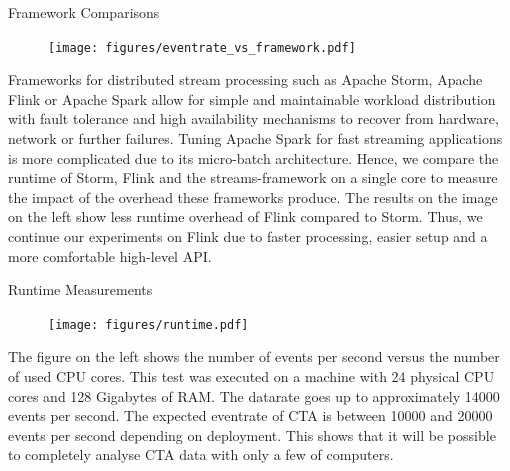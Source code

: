 \begin{multicols}{2}
    \begin{block}[]{Framework Comparisons}%
      \begin{multicols}{2}
        \begin{figure}
          \texttt{[image: figures/eventrate\_vs\_framework.pdf]}\\
        \end{figure}
        \columnbreak
        Frameworks for distributed stream processing such as Apache Storm\cite{storm}, Apache Flink\cite{flink} or Apache Spark allow for simple and maintainable workload distribution with fault tolerance and high availability mechanisms to recover from hardware, network or further failures.
        Tuning Apache Spark for fast streaming applications is more complicated due to its micro-batch architecture.
        Hence, we compare the runtime of Storm, Flink and the streams-framework\cite{streams} 
        on a single core to measure the impact of the overhead these frameworks produce.
        The results 
	on the image on the left
	show less runtime overhead of Flink compared to Storm. 
        Thus, we continue our experiments on Flink due to faster processing, easier setup and a more comfortable high-level API.
      \end{multicols}
    \end{block}%

    \begin{block}[]{Runtime Measurements}%
      \begin{multicols}{2}
        \begin{figure}
          \texttt{[image: figures/runtime.pdf]}\\
        \end{figure}
        \columnbreak
          The figure on the left shows the number of events per second versus the number of used CPU cores.
          This test was executed on a machine with 24 physical CPU cores and 128 Gigabytes of RAM.
          The datarate goes up to approximately \num{14000} events per second. The expected eventrate of CTA is between
          \num{10000} and \num{20000} events per second depending on deployment\cite{trigger}.
          This shows that it will be possible to completely analyse CTA data with only a few of computers.
      \end{multicols}
    \end{block}%



\end{multicols}
